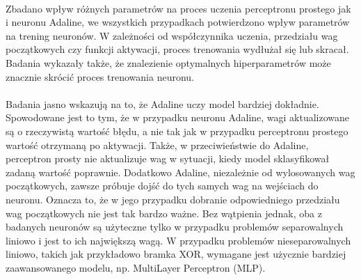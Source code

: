 \documentclass[../main.tex]{subfiles}
\begin{document}
    \paragraph{}
    Zbadano wpływ różnych parametrów na proces uczenia perceptronu prostego jak i neuronu Adaline, we wszystkich przypadkach potwierdzono wpływ parametrów na trening neuronów. W zależności od współczynnika uczenia, przedziału wag początkowych czy funkcji aktywacji, proces trenowania wydłużał się lub skracał. Badania wykazały także, że znalezienie optymalnych hiperparametrów może znacznie skrócić proces trenowania neuronu. 
    
    \paragraph{}
    Badania jasno wskazują na to, że Adaline uczy model bardziej dokładnie. Spowodowane jest to tym, że w przypadku neuronu Adaline, wagi aktualizowane są o rzeczywistą wartość błędu, a nie tak jak w przypadku perceptronu prostego wartość otrzymaną po aktywacji. Także, w przeciwieństwie do Adaline, perceptron prosty nie aktualizuje wag w sytuacji, kiedy model sklasyfikował zadaną wartość poprawnie. Dodatkowo Adaline, niezależnie od wylosowanych wag początkowych, zawsze próbuje dojść do tych samych wag na wejściach do neuronu. Oznacza to, że w jego przypadku dobranie odpowiedniego przedziału wag początkowych nie jest tak bardzo ważne. Bez wątpienia jednak, oba z badanych neuronów są użyteczne tylko w przypadku problemów separowalnych liniowo i jest to ich największą wagą. W przypadku problemów nieseparowalnych liniowo, takich jak przykładowo bramka XOR, wymagane jest użycznie bardziej zaawansowanego modelu, np. MultiLayer Perceptron (MLP).
\end{document}
